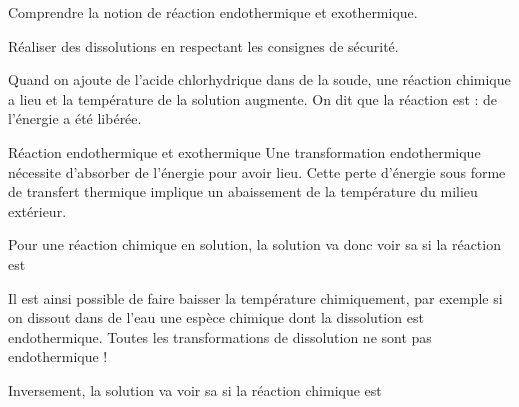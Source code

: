 \sndEnTeteSix

\vspace*{-28pt}

\begin{objectifs}
  \item Comprendre la notion de réaction endothermique et exothermique.
  \item Réaliser des dissolutions en respectant les consignes de sécurité.
\end{objectifs}

\begin{contexte}
  Quand on ajoute de l'acide chlorhydrique dans de la soude, une réaction chimique a lieu et la température de la solution augmente.
  On dit que la réaction est  : de l'énergie a été libérée.
  
\end{contexte}
\bigskip


\begin{doc}{Réaction endothermique et exothermique}
  Une transformation endothermique nécessite d'absorber de l'énergie pour avoir lieu.
  Cette perte d'énergie sous forme de transfert thermique implique un abaissement de la température du milieu extérieur.
  
  \begin{encart}
    Pour une réaction chimique en solution, la solution va donc voir sa  si la réaction est 
  \end{encart}
  
  Il est ainsi possible de faire baisser la température chimiquement, par exemple si on dissout dans de l'eau une espèce chimique dont la dissolution est endothermique.
  \attention Toutes les transformations de dissolution ne sont pas endothermique !
  
  \begin{encart}
    Inversement, la solution va voir sa  si la réaction chimique est 
  \end{encart}
\end{doc}
\bigskip

